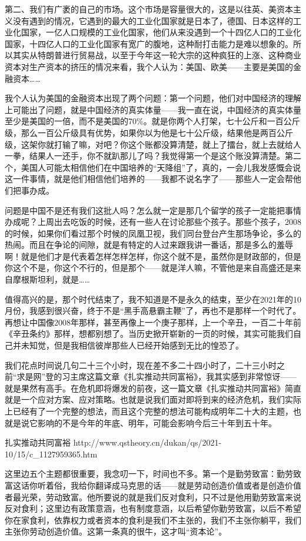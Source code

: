 \documentclass[UTF8, 12pt, a4paper]{ctexrep}
\begin{document}
第二、我们有广袤的自己的市场。这个市场是容量很大的，这是以往英、美资本主义没有遇到的情况，它遇到的最大的工业化国家就是日本了，德国、日本这样的工业化国家，一亿人口规模的工业化国家，他们从来没遇到一个十四亿人口的工业化国家，十四亿人口的工业化国家有宽广的腹地，这种耐打击能力是难以想象的。所以其实从特朗普进行贸易战，以至于今年这一轮大宗的这种疯狂的上涨、这种商业资本对生产资本的挤压的情况来看，我个人认为：美国、欧美——主要是美国的金融资本……

我个人认为美国的金融资本出现了两个问题：第一个问题，他们对中国经济的理解上可能出了问题，就是中国经济的真实体量——我一直在说，中国经济的真实体量至少是美国的一倍，而不是美国的70\%。就是你两个人打架，七十公斤和一百公斤级，那么一百公斤级具有优势，如果你以为他是七十公斤级，结果他是两百公斤级，这架你就打输了嘛，对吧？你这个账都没算清楚，就上了擂台，就上去就给人一拳，结果人一还手，你不就趴那儿了吗？我觉得第一个是这个账没算清楚。第二个，美国人可能太相信他们在中国培养的“天降组”了，真的，一会儿我发感慨会说这一件事情，就是他们相信他们培养的——我都不说名字了——那些人一定会帮他们把事办成。

问题是中国不是还有我们这批人吗？怎么就一定是那几个留学的孩子一定能把事情办成呢？上周出去吃饭的时候，还有一些人在讨论那些个孩子。那些个孩子，2008的时候，如果你们看过那个时候的凤凰卫视，我们同台登台产生那场争论，多么的热闹。而且在争论的间隙，就是有特定的人过来跟我讲一番话，那是多么的羞辱啊！就是他们才是代表着怎样怎样怎样，你这个就不是，虽然你是财政部的，但是你这个不是，你这个不行的，但是那个——就是洋人嘛，不管他是来自高盛还是来自摩根斯坦利，就是……

值得高兴的是，那个时代结束了，我不知道是不是永久的结束，至少在2021年的10月份，我感到很兴奋，终于不是“黑手高悬霸主鞭”了，再也不是那样一个时代了。再想让中国像2008年那样，甚至再像上一个庚子那样，上一个辛丑，一百二十年前《辛丑条约》那样，想都别想了。当历史掀开崭新的一页的时候，其实可能我们自己并未知觉，但是我相信彼岸那些人已经开始感到无比的惶恐了。

我们花点时间说几句二十三个小时，现在差不多二十四小时了，二十三小时之前“求是网”登的习主席这篇文章《扎实推动共同富裕》，我其实感到非常惊讶——就是果然有高手。在危机即将爆发的前夜，这一篇文章《扎实推动共同富裕》简直就是一个应对方案、应对策略。也就是说我们面对即将到来的经济危机，我们实际上已经有了一个完整的想法，而且这个完整的想法可能构成明年二十大的主题，也就是说它影响的不是今年的年底、明年，可能会影响今后三十年到五十年。

扎实推动共同富裕 http://www.qstheory.cn/dukan/qs/2021-10/15/c\_1127959365.htm

这里边五个主题都很重要，我念叨一下，时间也不多。第一个是勤劳致富：勤劳致富这话你听着俗，我给你翻译成马克思的话——就是劳动创造价值或者是创造价值者最光荣，劳动致富。他所要说的就是我们反对食利，只不过是他用勤劳致富来说反对食利；这里边有政策意涵，也有制度意涵，以后希望你勤劳致富，以后不希望你在家食利，依靠权力或者资本的食利是我们不主张的，我们不主张你躺平，我们主张你劳动创造价值。这第一条真的很牛，这才叫“资本论”。
\end{document}
